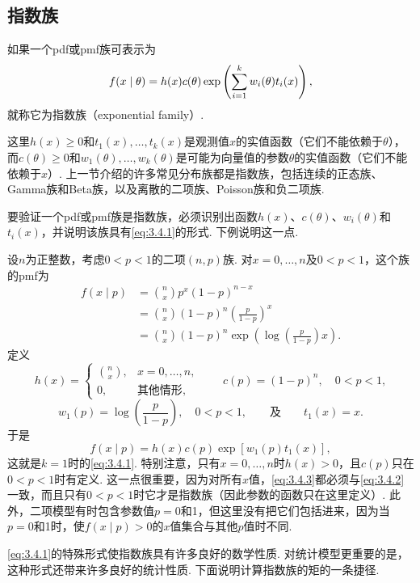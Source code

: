 \subsection{指数族}\label{sec:3.4}
如果一个pdf或pmf族可表示为
\begin{equation}\label{eq:3.4.1}\index{SI0435@指数族}
f(x\mid\theta)=h(x)c(\theta)\exp\left(\sum_{i=1}^k w_i(\theta)t_i(x)\right),
\end{equation}
就称它为指数族（exponential family）.

这里$h(x)\ge0$和$t_1(x),\ldots,t_k(x)$是观测值$x$的实值函数（它们不能依赖于$\theta$），而$c(\theta)\ge0$和$w_1(\theta),\ldots,w_k(\theta)$是可能为向量值的参数$\theta$的实值函数（它们不能依赖\mbox{于$x$）.} 上一节介绍的许多常见分布族都是指数族，包括连续的正态族、Gamma族和Beta族，以及离散的二项族、Poisson族和负二项族.

要验证一个pdf或pmf族是指数族，必须识别出函数$h(x)$、$c(\theta)$、$w_i(\theta)$和$t_i(x)$，并说明该族具有\eqref{eq:3.4.1}的形式. 下例说明这一点.

\begin{example}[二项指数族]\label{ex:3.4.1}
设$n$为正整数，考虑$0<p<1$的二项$(n,p)$族. 对$x=0,\ldots,n$及$0<p<1$，这个族的pmf为
\begin{equation}\label{eq:3.4.2}
\begin{aligned}
f(x\mid p)&=\binom nx p^x(1-p)^{n-x}\\
&=\binom nx(1-p)^n\left(\frac p{1-p}\right)^x\\
&=\binom nx(1-p)^n\exp\left(\log\left(\frac p{1-p}\right)x\right).
\end{aligned}
\end{equation}
定义
$$h(x)=\begin{cases}\binom nx,&x=0,\ldots,n,\\0,&\text{其他情形},\end{cases}\qquad c(p)=(1-p)^n,\quad0<p<1,$$
$$w_1(p)=\log\left(\frac p{1-p}\right),\quad0<p<1,\qquad\text{及}\qquad t_1(x)=x.$$
于是
\begin{equation}\label{eq:3.4.3}
f(x\mid p)=h(x)c(p)\exp[w_1(p)t_1(x)],
\end{equation}
这就是$k=1$时的\eqref{eq:3.4.1}. 特别注意，只有$x=0,\ldots,n$时$h(x)>0$，且$c(p)$只在$0<p<1$时有定义. 这一点很重要，因为对所有$x$值，\eqref{eq:3.4.3}都必须与\eqref{eq:3.4.2}一致，而且只有$0<p<1$时它才是指数族（因此参数的函数只在这里定义）. 此外，二项模型有时包含参数值$p=0$和1，但这里没有把它们包括进来，因为当$p=0$和1时，使$f(x\mid p)>0$的$x$值集合与其他$p$值时不同.
\end{example}
\eqref{eq:3.4.1}的特殊形式使指数族具有许多良好的数学性质. 对统计模型更重要的是，这种形式还带来许多良好的统计性质. 下面说明计算指数族的矩的一条捷径.

